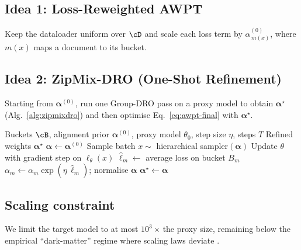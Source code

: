 \subsection{Idea 1: Loss-Reweighted AWPT}
Keep the dataloader uniform over $\cD$ and scale each loss term by $\alpha^{(0)}_{\,m(x)}$, where $m(x)$ maps a document to its bucket.

\subsection{Idea 2: ZipMix-DRO (One-Shot Refinement)}
Starting from $\boldsymbol{\alpha}^{(0)}$, run one Group-DRO pass on a proxy model to obtain $\boldsymbol{\alpha}^{\star}$ (Alg.~\ref{alg:zipmixdro}) and then optimise Eq.~\eqref{eq:awpt-final} with $\boldsymbol{\alpha}^{\star}$.

\begin{algorithm}
\caption{ZipMix-DRO: One-Shot Group-DRO Refinement}\label{alg:zipmixdro}
\begin{algorithmic}[1]
\Require Buckets $\cB$, alignment prior $\boldsymbol{\alpha}^{(0)}$,
         proxy model $\theta_0$, step size $\eta$, steps $T$
\Ensure Refined weights $\boldsymbol{\alpha}^{\star}$
\State $\boldsymbol{\alpha} \leftarrow \boldsymbol{\alpha}^{(0)}$
  \State Sample batch $x \sim$ hierarchical sampler$(\boldsymbol{\alpha})$
  \State Update $\theta$ with gradient step on $\ell_\theta(x)$
  \State $\hat{\ell}_m \leftarrow$ average loss on bucket $B_m$ 
  \State $\alpha_m \leftarrow \alpha_m \exp(\eta\,\hat{\ell}_m)$;
         normalise $\boldsymbol{\alpha}$
\EndFor
\State \Return $\boldsymbol{\alpha}^{\star} \leftarrow \boldsymbol{\alpha}$
\end{algorithmic}
\end{algorithm}

\subsection{Scaling constraint}\label{sec:scaling}
We limit the target model to at most $10^{3}$\,$\times$ the proxy size, remaining below the empirical ``dark-matter'' regime where scaling laws deviate \citep{gpt4report,schaeffer2024predictive}.


